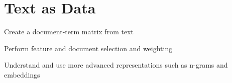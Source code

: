 \chapter{Text as Data}
\label{chap:dtm}

\begin{abstract}{Abstract}
  This chapter shows how you can analyze texts that are stored as a data frame column or variable using functions from the package  in R and the package  in Python in Python and R.
  Please see  for more information on reading and cleaning text.
  
\end{abstract}


\begin{objectives}
\item Create a document-term matrix from text
\item Perform feature and document selection and weighting
\item Understand and use more advanced representations such as n-grams and embeddings
\end{objectives}




